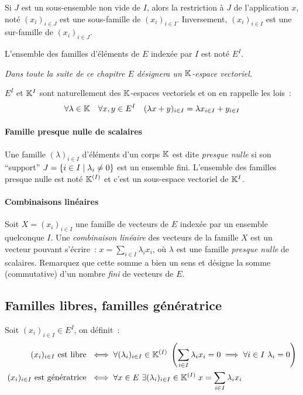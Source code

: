 Si $J$ est un sous-ensemble non vide de $I$, alors la restriction à $J$ de l'application $x$, noté $(x_i)_{i \in J}$ est une sous-famille de $(x_i)_{i \in I}$. Inversement, $(x_i)_{i \in I}$ est une sur-famille de $(x_i)_{i \in J}$.

L'ensemble des familles d'éléments de $E$ indexée par $I$ est noté $E^I$.

\emph{Dans toute la suite de ce chapitre $E$ désignera un $\mathbb{K}$-espace vectoriel.}

$E^I$ et $\mathbb{K}^I$ sont naturellement des $\mathbb{K}$-espaces vectoriels et on en rappelle les lois~:
\begin{align}
	\forall \lambda \in \mathbb{K} \quad \forall x,y \in E^I \quad (\lambda x +y)_{i \in I} = \lambda x_{i\in I} + y_{i\in I}	
\end{align}

\paragraph{Famille presque nulle de scalaires}
Une famille $(\lambda)_{i \in I}$ d'éléments d'un corps $\mathbb{K}$ est dite \emph{presque nulle} si son ``support'' $J =\left\{i \in I\mathrel{}\middle|\mathrel{}\lambda_i \neq 0\right\}$ est un ensemble fini. L'ensemble des familles presque nulle est noté $\mathbb{K}^{(I)}$ et c'est un sous-espace vectoriel de $\mathbb{K}^I$.

\paragraph{Combinaisons linéaires}
Soit $X=(x_i)_{i \in I}$ une famille de vecteurs de $E$ indexée par un ensemble quelconque $I$. Une \emph{combinaison linéaire} des vecteurs de la famille $X$ est un vecteur pouvant s'écrire~: $x = \sum_{i \in I} \lambda_i x_i$, où $\lambda$ est une famille \emph{presque nulle} de scalaires. Remarquez que cette somme a bien un sens et désigne la somme (commutative) d'un nombre \emph{fini} de vecteurs de $E$.

\subsection{Familles libres, familles génératrice}

Soit $(x_i)_{i \in I} \in E^I$, on définit~:
\begin{align}
	(x_i)_{i \in I} \text{ est libre } &\iff \forall (\lambda_i)_{i \in I} \in \K^{(I)} \; \left(\sum_{i \in I} \lambda_i x_i = 0 \implies \forall i \in I \ \lambda_i=0 \right) \\
	(x_i)_{i \in I} \text{ est génératrice } &\iff \forall x \in E \ \exists  (\lambda_i)_{i \in I} \in \K^{(I)} \; x = \sum_{i \in I} \lambda_i x_i
\end{align}

